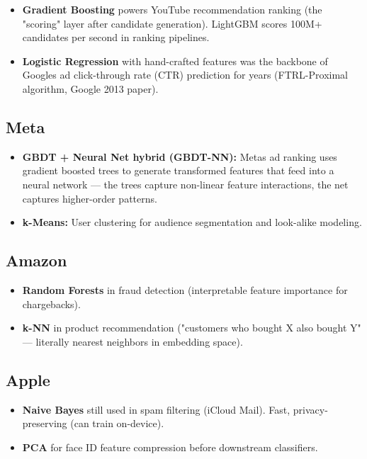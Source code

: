 \documentclass[11pt]{article}
\providecommand{\tightlist}{\setlength{\itemsep}{1pt}\setlength{\parskip}{0pt}}
\begin{document}
\begin{itemize}
\tightlist
\item
  \textbf{Gradient Boosting} powers YouTube recommendation ranking (the "scoring" layer after candidate generation). LightGBM scores 100M+ candidates per second in ranking pipelines.
\item
  \textbf{Logistic Regression} with hand-crafted features was the backbone of Google\textquotesingle s ad click-through rate (CTR) prediction for years (FTRL-Proximal algorithm, Google 2013 paper).
\end{itemize}

\subsection{Meta}\label{meta}

\begin{itemize}
\tightlist
\item
  \textbf{GBDT + Neural Net hybrid (GBDT-NN):} Meta\textquotesingle s ad ranking uses gradient boosted trees to generate transformed features that feed into a neural network --- the trees capture non-linear feature interactions, the net captures higher-order patterns.
\item
  \textbf{k-Means:} User clustering for audience segmentation and look-alike modeling.
\end{itemize}

\subsection{Amazon}\label{amazon}

\begin{itemize}
\tightlist
\item
  \textbf{Random Forests} in fraud detection (interpretable feature importance for chargebacks).
\item
  \textbf{k-NN} in product recommendation ("customers who bought X also bought Y" --- literally nearest neighbors in embedding space).
\end{itemize}

\subsection{Apple}\label{apple}

\begin{itemize}
\tightlist
\item
  \textbf{Naive Bayes} still used in spam filtering (iCloud Mail). Fast, privacy-preserving (can train on-device).
\item
  \textbf{PCA} for face ID feature compression before downstream classifiers.
\end{itemize}
\end{document}
